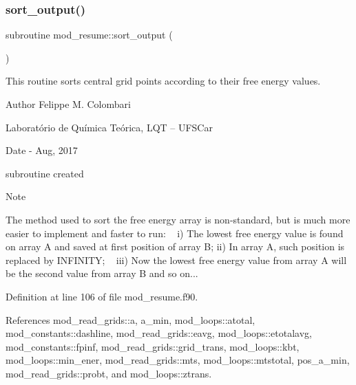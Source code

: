 \subsubsection{\texorpdfstring{sort\+\_\+output()}{sort\_output()}}
{\footnotesize\ttfamily subroutine mod\+\_\+resume\+::sort\+\_\+output (\begin{DoxyParamCaption}{ }\end{DoxyParamCaption})}



This routine sorts central grid points according to their free energy values. 

\begin{DoxyAuthor}{Author}
Felippe M. Colombari
\begin{DoxyItemize}
\item Laboratório de Química Teórica, L\+QT -- U\+F\+S\+Car 
\end{DoxyItemize}
\end{DoxyAuthor}
\begin{DoxyDate}{Date}
-\/ Aug, 2017
\begin{DoxyItemize}
\item subroutine created 
\end{DoxyItemize}
\end{DoxyDate}
\begin{DoxyNote}{Note}
~\newline

\begin{DoxyItemize}
\item The method used to sort the free energy array is non-\/standard, but is much more easier to implement and faster to run\+: ~\newline
 i) The lowest free energy value is found on array A and saved at first position of array B; ii) In array A, such position is replaced by I\+N\+F\+I\+N\+I\+TY; ~\newline
 iii) Now the lowest free energy value from array A will be the second value from array B and so on... 
\end{DoxyItemize}
\end{DoxyNote}


Definition at line 106 of file mod\+\_\+resume.\+f90.



References mod\+\_\+read\+\_\+grids\+::a, a\+\_\+min, mod\+\_\+loops\+::atotal, mod\+\_\+constants\+::dashline, mod\+\_\+read\+\_\+grids\+::eavg, mod\+\_\+loops\+::etotalavg, mod\+\_\+constants\+::fpinf, mod\+\_\+read\+\_\+grids\+::grid\+\_\+trans, mod\+\_\+loops\+::kbt, mod\+\_\+loops\+::min\+\_\+ener, mod\+\_\+read\+\_\+grids\+::mts, mod\+\_\+loops\+::mtstotal, pos\+\_\+a\+\_\+min, mod\+\_\+read\+\_\+grids\+::probt, and mod\+\_\+loops\+::ztrans.



